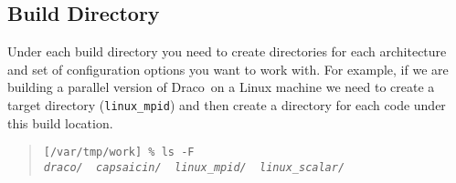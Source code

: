\documentclass[11pt]{nmemo}
\newcommand{\comp}[1]{\normalfont\footnotesize\texttt{#1}\normalsize}
\newcommand{\draco}{{\normalfont\sffamily Draco}}
\newcommand{\metis}{{\normalfont\sffamily Metis}}
\newcommand{\svn}{{\normalfont\bfseries SVN}}
\begin{document}
%
%
%
%
%
%

\subsection{Build Directory}
\label{builddir}

Under each build directory you need to create directories for each
architecture and set of configuration options you want to work with.
For example, if we are building a parallel version of \draco\ on a
Linux machine we need to create a target directory (\comp{linux\_mpid})
and then create a directory for each code under this build location.

\footnotesize
\begin{verse}
\texttt{[/var/tmp/work] \% ls -F \\
\emph{draco/\ \ capsaicin/\ \ linux\_mpid/\ \ linux\_scalar/ }}
\end{verse}
\end{document}
